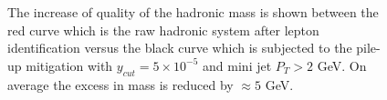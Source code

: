    \begin{figure}
        \centering
       
        \caption{The increase of quality of the hadronic mass is shown between the red curve which is the raw hadronic system after lepton identification versus the black curve which is subjected to the pile-up mitigation with $y_{cut} = 5\times10^{-5}$ and mini jet $P_T > 2$ GeV. On average the excess in mass is reduced by $\approx 5$ GeV. }
        \label{fig:supmass}
\end{figure}


